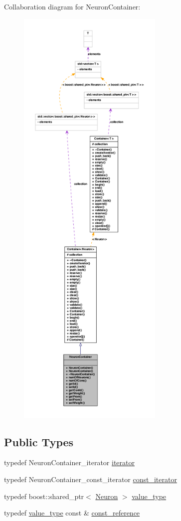 Collaboration diagram for NeuronContainer:
\nopagebreak
\begin{figure}[H]
\begin{center}
\leavevmode
\includegraphics[height=600pt]{class_neuron_container__coll__graph}
\end{center}
\end{figure}
\subsection*{Public Types}
\begin{DoxyCompactItemize}
\item 
typedef NeuronContainer\_\-iterator \hyperlink{class_neuron_container_abf81356adaea3bfc64aa03777e9a8def}{iterator}
\item 
typedef NeuronContainer\_\-const\_\-iterator \hyperlink{class_neuron_container_a41749602f05e7610da7f0f1fd59f5442}{const\_\-iterator}
\item 
typedef boost::shared\_\-ptr$<$ \hyperlink{class_neuron}{Neuron} $>$ \hyperlink{class_neuron_container_ac067345f1d27a5b04e4d9487b319ccaa}{value\_\-type}
\item 
typedef \hyperlink{class_neuron_container_ac067345f1d27a5b04e4d9487b319ccaa}{value\_\-type} const \& \hyperlink{class_neuron_container_a468ffbb00b15553f73da46dd62c91c8d}{const\_\-reference}
\end{DoxyCompactItemize}
